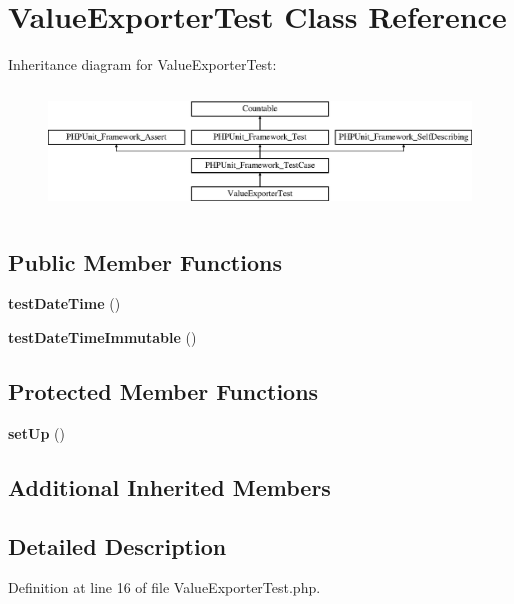 \section{Value\+Exporter\+Test Class Reference}
\label{class_symfony_1_1_component_1_1_http_kernel_1_1_tests_1_1_data_collector_1_1_util_1_1_value_exporter_test}
Inheritance diagram for Value\+Exporter\+Test\+:\begin{figure}[H]
\begin{center}
\leavevmode
\includegraphics[height=3.303835cm]{class_symfony_1_1_component_1_1_http_kernel_1_1_tests_1_1_data_collector_1_1_util_1_1_value_exporter_test}
\end{center}
\end{figure}
\subsection*{Public Member Functions}
\begin{DoxyCompactItemize}
\item 
{\bf test\+Date\+Time} ()
\item 
{\bf test\+Date\+Time\+Immutable} ()
\end{DoxyCompactItemize}
\subsection*{Protected Member Functions}
\begin{DoxyCompactItemize}
\item 
{\bf set\+Up} ()
\end{DoxyCompactItemize}
\subsection*{Additional Inherited Members}


\subsection{Detailed Description}


Definition at line 16 of file Value\+Exporter\+Test.\+php.




